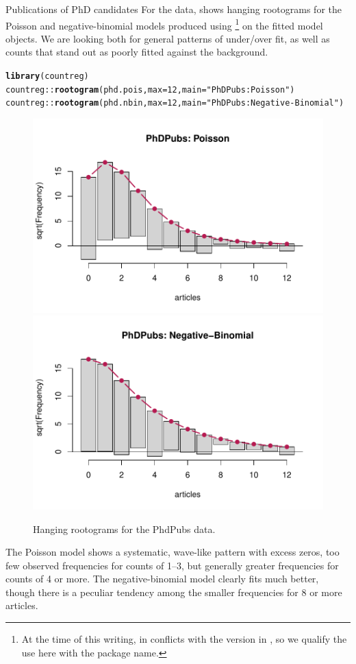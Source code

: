 \documentclass[11pt]{book}\usepackage[]{graphicx}\usepackage[]{color}
\makeatletter
\newcommand{\hlnum}[1]{\textcolor[rgb]{0.686,0.059,0.569}{#1}}%
\newcommand{\hlstr}[1]{\textcolor[rgb]{0.192,0.494,0.8}{#1}}%
\newcommand{\hlopt}[1]{\textcolor[rgb]{0,0,0}{#1}}%
\newcommand{\hlstd}[1]{\textcolor[rgb]{0.345,0.345,0.345}{#1}}%
\newcommand{\hlkwc}[1]{\textcolor[rgb]{0.333,0.667,0.333}{#1}}%
\newcommand{\hlkwd}[1]{\textcolor[rgb]{0.737,0.353,0.396}{\textbf{#1}}}%
\newenvironment{kframe}{%
 \def\at@end@of@kframe{}%
 \ifinner\ifhmode%
  \def\at@end@of@kframe{\end{minipage}}%
  \begin{minipage}{\columnwidth}%
 \fi\fi%
 \def\FrameCommand##1{\hskip\@totalleftmargin \hskip-\fboxsep
 \colorbox{shadecolor}{##1}\hskip-\fboxsep
     \hskip-\linewidth \hskip-\@totalleftmargin \hskip\columnwidth}%
 \MakeFramed {\advance\hsize-\width
   \@totalleftmargin\z@ \linewidth\hsize
   \@setminipage}}%
 {\par\unskip\endMakeFramed%
 \at@end@of@kframe}
\newenvironment{knitrout}{}{} %
\renewenvironment{knitrout}{\small\renewcommand{\baselinestretch}{.85}}{} %
\makeatother
\begin{document}
\begin{Example}[phdpubs4]{Publications of PhD candidates}
For the  data,  shows hanging rootograms for the
Poisson and negative-binomial models produced using %
\footnote{
At the time of this writing,  in  conflicts with
the version in , so we qualify the use here with the package name.
}
on the fitted model objects.  We are looking both for general patterns of under/over fit, as well
as counts that stand out as poorly fitted against the background.

\begin{knitrout}
\color{fgcolor}\begin{kframe}
\begin{alltt}
\hlkwd{library}\hlstd{(countreg)}
\hlstd{countreg}\hlopt{::}\hlkwd{rootogram}\hlstd{(phd.pois,} \hlkwc{max}\hlstd{=}\hlnum{12}\hlstd{,} \hlkwc{main}\hlstd{=}\hlstr{"PhDPubs: Poisson"}\hlstd{)}
\hlstd{countreg}\hlopt{::}\hlkwd{rootogram}\hlstd{(phd.nbin,} \hlkwc{max}\hlstd{=}\hlnum{12}\hlstd{,} \hlkwc{main}\hlstd{=}\hlstr{"PhDPubs: Negative-Binomial"}\hlstd{)}
\end{alltt}
\end{kframe}\begin{figure}[!htbp]

\centerline{\includegraphics[width=.49\textwidth]{ch09/fig/phdpubs4-rootogram-1} 
\includegraphics[width=.49\textwidth]{ch09/fig/phdpubs4-rootogram-2} }

\caption[Hanging rootograms for the PhdPubs data]{Hanging rootograms for the PhdPubs data.\label{fig:phdpubs4-rootogram}}
\end{figure}


\end{knitrout}
The Poisson model shows a systematic, wave-like pattern with excess zeros, too few observed frequencies for
counts of
1--3, but generally greater frequencies for counts of 4 or more.  The negative-binomial model
clearly fits much better, though there is a peculiar tendency among the smaller
frequencies for 8 or more articles.
\end{Example}
\end{document}
